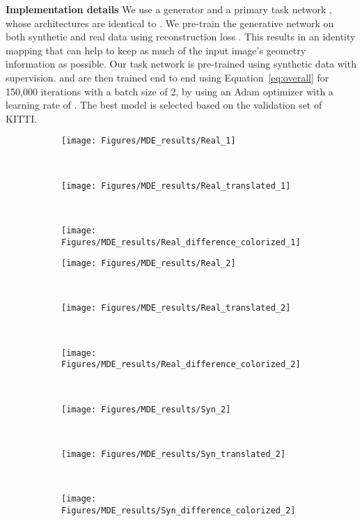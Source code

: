 \documentclass[10pt,twocolumn,letterpaper]{article}
\begin{document}
\textbf{Implementation details}
We use a generator  and a primary task network , whose architectures are identical to \cite{GASDA}.
We pre-train the generative network  on both synthetic and real data using reconstruction loss .
This results in an identity mapping that can help  to keep as much of the input image's geometry information as possible.
Our task network is pre-trained using synthetic data with supervision.
 and  are then trained end to end using Equation~\ref{eq:overall} for 150,000 iterations with a batch size of 2, by using an Adam optimizer with a learning rate of .
The best model is selected based on the validation set of KITTI.

\begin{figure*}
\begin{subfigure}{0.49\linewidth}
    \centering
    \begin{subfigure}{0.33\linewidth}{
        \texttt{[image: Figures/MDE\_results/Real\_1]}}
    \end{subfigure}~
    \begin{subfigure}{0.33\linewidth}{
        \texttt{[image: Figures/MDE\_results/Real\_translated\_1]}}
    \end{subfigure}~
    \begin{subfigure}{0.33\linewidth}{
        \texttt{[image: Figures/MDE\_results/Real\_difference\_colorized\_1]}}
    \end{subfigure}

    \begin{subfigure}{0.33\linewidth}{
        \texttt{[image: Figures/MDE\_results/Real\_2]}}
        \caption{}
    \end{subfigure}~
    \begin{subfigure}{0.33\linewidth}{
        \texttt{[image: Figures/MDE\_results/Real\_translated\_2]}}
        \caption{}
    \end{subfigure}~
    \begin{subfigure}{0.33\linewidth}{
        \texttt{[image: Figures/MDE\_results/Real\_difference\_colorized\_2]}}
        \caption{}
    \end{subfigure}\end{subfigure}\hspace{0.02\textwidth}
~
\begin{subfigure}{0.49\linewidth}
    \centering
    \begin{subfigure}{0.33\linewidth}{
        \texttt{[image: Figures/MDE\_results/Syn\_2]}}
    \end{subfigure}~
    \begin{subfigure}{0.33\linewidth}{
        \texttt{[image: Figures/MDE\_results/Syn\_translated\_2]}}
    \end{subfigure}~
    \begin{subfigure}{0.33\linewidth}{
        \texttt{[image: Figures/MDE\_results/Syn\_difference\_colorized\_2]}}
    \end{subfigure}


\end{subfigure}
\end{figure*}
\end{document}
